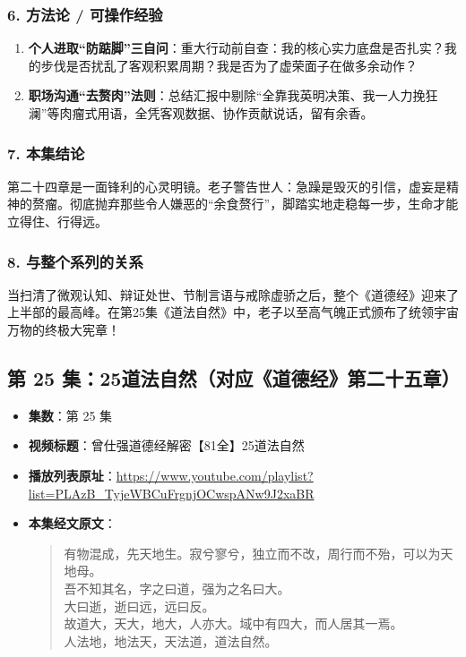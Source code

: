 \subsubsection{6. 方法论 / 可操作经验}
\begin{enumerate}
    \item \textbf{个人进取“防踮脚”三自问}：重大行动前自查：我的核心实力底盘是否扎实？我的步伐是否扰乱了客观积累周期？我是否为了虚荣面子在做多余动作？
    \item \textbf{职场沟通“去赘肉”法则}：总结汇报中剔除“全靠我英明决策、我一人力挽狂澜”等肉瘤式用语，全凭客观数据、协作贡献说话，留有余香。
\end{enumerate}

\subsubsection{7. 本集结论}
第二十四章是一面锋利的心灵明镜。老子警告世人：急躁是毁灭的引信，虚妄是精神的赘瘤。彻底抛弃那些令人嫌恶的“余食赘行”，脚踏实地走稳每一步，生命才能立得住、行得远。

\subsubsection{8. 与整个系列的关系}
当扫清了微观认知、辩证处世、节制言语与戒除虚骄之后，整个《道德经》迎来了上半部的最高峰。在第25集《道法自然》中，老子以至高气魄正式颁布了统领宇宙万物的终极大宪章！

\clearpage

\subsection{第 25 集：25道法自然（对应《道德经》第二十五章）}
\label{sec:ep25}

\begin{itemize}
    \item \textbf{集数}：第 25 集
    \item \textbf{视频标题}：曾仕强道德经解密【81全】25道法自然
    \item \textbf{播放列表原址}：\url{https://www.youtube.com/playlist?list=PLAzB_TyjeWBCuFrgnjOCwspANw9J2xaBR}
    \item \textbf{本集经文原文}：
    \begin{quote}\kaishu
    有物混成，先天地生。寂兮寥兮，独立而不改，周行而不殆，可以为天地母。\\
    吾不知其名，字之曰道，强为之名曰大。\\
    大曰逝，逝曰远，远曰反。\\
    故道大，天大，地大，人亦大。域中有四大，而人居其一焉。\\
    人法地，地法天，天法道，道法自然。
    \end{quote}
\end{itemize}

